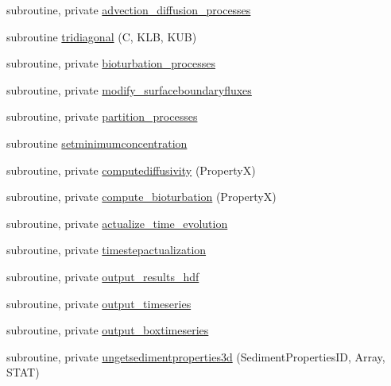 \begin{DoxyCompactItemize}
subroutine, private \mbox{\hyperlink{namespacemodulesedimentproperties_ad4e53e8aa65867e0dd71960c0df2dc06}{advection\+\_\+diffusion\+\_\+processes}}
\item 
subroutine \mbox{\hyperlink{namespacemodulesedimentproperties_a36e12eab9520e6564647d977991906bf}{tridiagonal}} (C, K\+LB, K\+UB)
\item 
subroutine, private \mbox{\hyperlink{namespacemodulesedimentproperties_a1d7c298cf760f1e569bc908fe283cb62}{bioturbation\+\_\+processes}}
\item 
subroutine, private \mbox{\hyperlink{namespacemodulesedimentproperties_a747aaf088749f649d9ca7c244a31c529}{modify\+\_\+surfaceboundaryfluxes}}
\item 
subroutine, private \mbox{\hyperlink{namespacemodulesedimentproperties_a28bead70b224e32b9105e7f44858867d}{partition\+\_\+processes}}
\item 
subroutine \mbox{\hyperlink{namespacemodulesedimentproperties_a9f511535dd36e19d03774f384ee21bc9}{setminimumconcentration}}
\item 
subroutine, private \mbox{\hyperlink{namespacemodulesedimentproperties_a1bb06862669d539399995d64ea159fde}{computediffusivity}} (PropertyX)
\item 
subroutine, private \mbox{\hyperlink{namespacemodulesedimentproperties_ae53733a5fdfd90feccc3a7f557e05cc9}{compute\+\_\+bioturbation}} (PropertyX)
\item 
subroutine, private \mbox{\hyperlink{namespacemodulesedimentproperties_a6cedd3db0fa694031e6d17f2ef9d7eb9}{actualize\+\_\+time\+\_\+evolution}}
\item 
subroutine, private \mbox{\hyperlink{namespacemodulesedimentproperties_a9bc2949e84269f97fba7dd6633e221d9}{timestepactualization}}
\item 
subroutine, private \mbox{\hyperlink{namespacemodulesedimentproperties_adcdacad517c08441d00e6cb73a5bff47}{output\+\_\+results\+\_\+hdf}}
\item 
subroutine, private \mbox{\hyperlink{namespacemodulesedimentproperties_a45f67a80f9c968c6138d9eeef961a523}{output\+\_\+timeseries}}
\item 
subroutine, private \mbox{\hyperlink{namespacemodulesedimentproperties_a3a4760ed6e653fdd099e8fe327ae428e}{output\+\_\+boxtimeseries}}
\item 
subroutine, private \mbox{\hyperlink{namespacemodulesedimentproperties_aee146c5fb6ec7343cd2af683f76043b9}{ungetsedimentproperties3d}} (Sediment\+Properties\+ID, Array, S\+T\+AT)
\item 

\end{DoxyCompactItemize}
